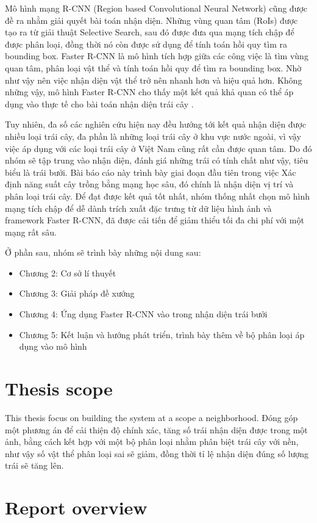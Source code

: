 Mô hình mạng R-CNN (Region based Convolutional Neural Network) cũng được đề ra nhằm giải quyết bài toán nhận diện. Những vùng quan tâm (RoIs) được tạo ra từ giải thuật Selective Search, sau đó được đưa qua mạng tích chập để được phân loại, đồng thời nó còn được sử dụng để tính toán hồi quy tìm ra bounding box. Faster R-CNN là mô hình tích hợp giữa các công việc là tìm vùng quan tâm, phân loại vật thể và tính toán hồi quy để tìm ra bounding box. Nhờ như vậy nên việc nhận diện vật thể trở nên nhanh hơn và hiệu quả hơn. Không những vậy, mô hình Faster R-CNN cho thấy một kết quả khả quan có thể áp dụng vào thực tế cho bài toán nhận diện trái cây \cite{bargoti2017deep}.

Tuy nhiên, đa số các nghiên cứu hiện nay đều hướng tới kết quả nhận diện được nhiều loại trái cây, đa phần là những loại trái cây ở khu vực nước ngoài, vì vậy việc áp dụng với các loại trái cây ở Việt Nam cũng rất cần được quan tâm. Do đó nhóm sẽ tập trung vào nhận diện, đánh giá những trái có tính chất như vậy, tiêu biểu là trái bưởi. Bài báo cáo này trình bày giai đoạn đầu tiên trong việc Xác định năng suất cây trồng bằng mạng học sâu, đó chính là nhận diện vị trí và phân loại trái cây. Để đạt được kết quả tốt nhất, nhóm thống nhất chọn mô hình mạng tích chập để dễ dành trích xuất đặc trưng từ  dữ liệu hình ảnh và framework Faster R-CNN, đã được cải tiến để giảm thiểu tối đa chi phí với một mạng rất sâu.

Ở phần sau, nhóm sẽ trình bày những nội dung sau:
\begin{itemize}
	\item Chương 2: Cơ sở lí thuyết
	\item Chương 3: Giải pháp đề xướng
	\item Chương 4: Ứng dụng Faster R-CNN vào trong nhận diện trái bưởi
	\item Chương 5: Kết luận và hướng phát triển, trình bày thêm về bộ phân loại áp dụng vào mô hình
\end{itemize} 

\section{Thesis scope}
This thesis focus on building the system at a scope a neighborhood. 
Đóng góp một phương án để cải thiện độ chính xác, tăng số trái nhận diện được trong một ảnh, bằng cách kết hợp với một bộ phân loại nhằm phân biệt trái cây với nền, như vậy số vật thể phân loại sai sẽ giảm, đồng thời tỉ lệ nhận diện đúng số lượng trái sẽ tăng lên.

\section{Report overview}
